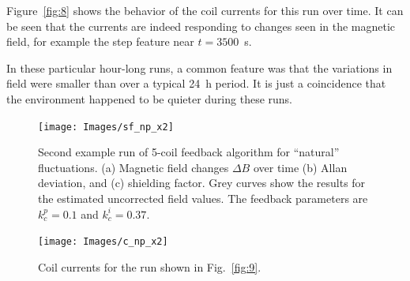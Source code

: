 
Figure~\ref{fig:8} shows the behavior of the coil currents for this
run over time.  It can be seen that the currents are indeed responding
to changes seen in the magnetic field, for example the step feature
near $t=3500$~s.


In these particular hour-long runs, a common feature was that the variations in field were smaller than over a typical 24~h period. It is just a coincidence that the environment happened to be quieter during these runs.

\begin{figure}
\centering
        \texttt{[image: Images/sf\_np\_x2]}
        \caption[Second example run of 5-coil feedback algorithm for ``natural'' fluctuations]{Second example run of 5-coil feedback algorithm for ``natural'' fluctuations.  (a) Magnetic field changes $\Delta B$ over time (b) Allan deviation, and (c) shielding factor.  Grey curves show the results for the estimated uncorrected field values.  The feedback parameters are $k_c^p=0.1$ and $k_c^i=0.37$.}
        \label{fig:9}
        \texttt{[image: Images/c\_np\_x2]}
        \caption{Coil currents for the run shown in Fig.~\ref{fig:9}.}
        \label{fig:10}
\end{figure}


